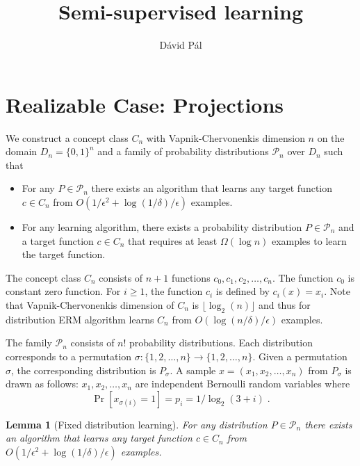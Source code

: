 \documentclass[12pt]{article}
\title{Semi-supervised learning}
\author{D\'avid P\'al}
\newtheorem{lemma}{Lemma}
\renewcommand{\P}{\mathcal{P}}
\begin{document}
\maketitle

\section{Realizable Case: Projections}

We construct a concept class $C_n$ with Vapnik-Chervonenkis dimension $n$ on the
domain $D_n = \{0,1\}^n$ and a family of probability distributions $\P_n$ over
$D_n$ such that
\begin{itemize}
\item For any $P \in \P_n$ there exists an algorithm that learns
any target function $c \in C_n$ from $O(1/\epsilon^2 + \log(1/\delta)/\epsilon)$ examples.
\item For any learning algorithm, there exists
a probability distribution $P \in \P_n$ and a target function $c \in C_n$
that requires at least $\Omega(\log n)$ examples to learn the target function.
\end{itemize}

The concept class $C_n$ consists of $n+1$ functions $c_0, c_1, c_2, \dots, c_n$.
The function $c_0$ is constant zero function. For $i \ge 1$, the function $c_i$
is defined by $c_i(x) = x_i$. Note that Vapnik-Chervonenkis
dimension of $C_n$ is $\lfloor \log_2(n) \rfloor$ and thus
for  distribution ERM algorithm learns
$C_n$ from $O(\log (n/\delta)/\epsilon)$ examples.

The family $\P_n$ consists of $n!$ probability distributions. Each distribution
corresponds to a permutation $\sigma:\{1,2,\dots,n\} \to \{1,2,\dots,n\}$. Given
a permutation $\sigma$, the corresponding distribution is $P_\sigma$.
A sample $x = (x_1, x_2, \dots, x_n)$ from $P_\sigma$ is drawn as follows:
$x_1, x_2, \dots, x_n$ are independent Bernoulli random variables
where
$$
\Pr[x_{\sigma(i)} = 1] = p_i = 1/\log_2(3 + i) \; .
$$

\begin{lemma}[Fixed distribution learning]
For any distribution $P \in \P_n$ there exists an algorithm that
learns any target function $c \in C_n$ from $O(1/\epsilon^2 + \log(1/\delta)/\epsilon)$
examples.
\end{lemma}
\end{document}
